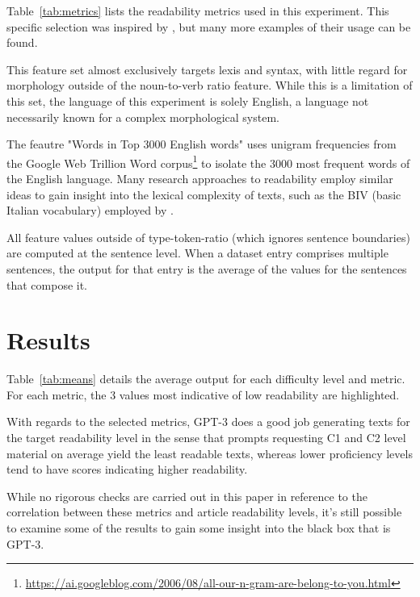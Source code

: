 \documentclass[11pt]{article}
\begin{document}


Table~\ref{tab:metrics} lists the readability metrics used in this experiment. This specific selection was inspired by \citep{venturi-etal-2015-nlp}, but many more examples of their usage can be found. 

This feature set almost exclusively targets lexis and syntax, with little regard for morphology outside of the noun-to-verb ratio feature. While this is a limitation of this set, the language of this experiment is solely English, a language not necessarily known for a complex morphological system.

The feautre "Words in Top 3000 English words" uses unigram frequencies from the Google Web Trillion Word corpus\footnote{\url{https://ai.googleblog.com/2006/08/all-our-n-gram-are-belong-to-you.html}} to isolate the 3000 most frequent words of the English language. Many research approaches to readability employ similar ideas to gain insight into the lexical complexity of texts, such as the BIV (basic Italian vocabulary) employed by \citep{dellorletta-etal-2011-read}.

All feature values outside of type-token-ratio (which ignores sentence boundaries) are computed at the sentence level. When a dataset entry comprises multiple sentences, the output for that entry is the average of the values for the sentences that compose it. 

\section{Results}



Table~\ref{tab:means} details the average output for each difficulty level and metric. For each metric, the 3 values most indicative of low readability are highlighted.

With regards to the selected metrics, GPT-3 does a good job generating texts for the target readability level in the sense that prompts requesting C1 and C2 level material on average yield the least readable texts, whereas lower proficiency levels tend to have scores indicating higher readability.
 
While no rigorous checks are carried out in this paper in reference to the correlation between these metrics and article readability levels, it's still possible to examine some of the results to gain some insight into the black box that is GPT-3.


\end{document}
